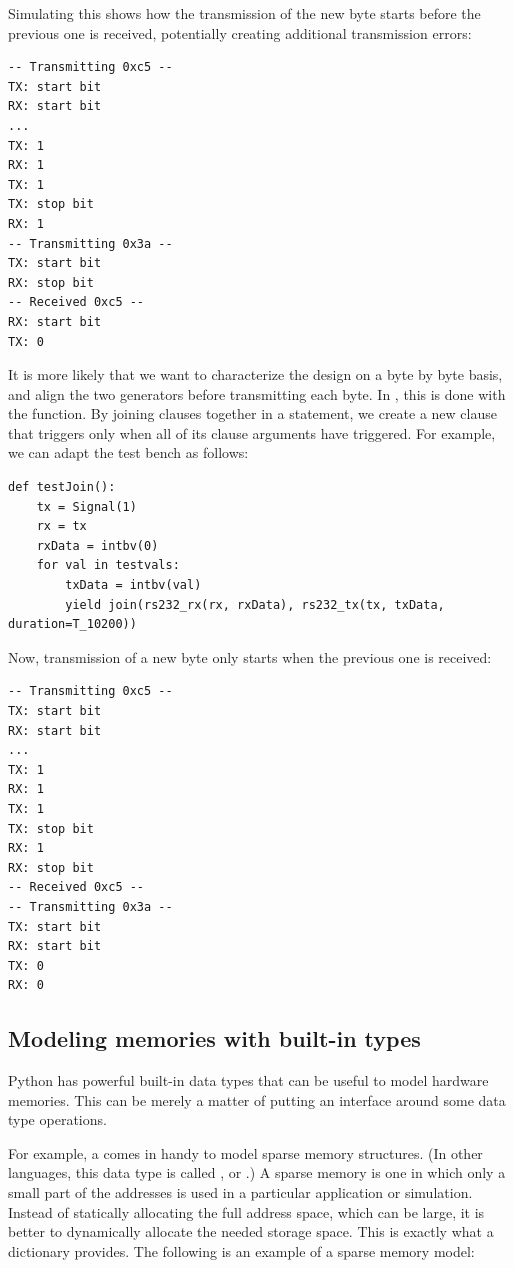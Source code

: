 Simulating this shows how the transmission of the new byte starts
before the previous one is received, potentially creating additional
transmission errors:

\begin{verbatim}
-- Transmitting 0xc5 --
TX: start bit
RX: start bit
...
TX: 1
RX: 1
TX: 1
TX: stop bit
RX: 1
-- Transmitting 0x3a --
TX: start bit
RX: stop bit
-- Received 0xc5 --
RX: start bit
TX: 0
\end{verbatim}

It is more likely that we want to characterize the design on a byte
by byte basis, and align the two generators before transmitting each
byte. In \myhdl{}, this is done with the  function. By
joining clauses together in a  statement, we create a new
clause that triggers only when all of its clause arguments have
triggered. For example, we can adapt the test bench as follows:

\begin{verbatim}
def testJoin():
    tx = Signal(1)
    rx = tx
    rxData = intbv(0)
    for val in testvals:
        txData = intbv(val)
        yield join(rs232_rx(rx, rxData), rs232_tx(tx, txData, duration=T_10200))
\end{verbatim}

Now, transmission of a new byte only starts when the previous one is received:

\begin{verbatim}
-- Transmitting 0xc5 --
TX: start bit
RX: start bit
...
TX: 1
RX: 1
TX: 1
TX: stop bit
RX: 1
RX: stop bit
-- Received 0xc5 --
-- Transmitting 0x3a --
TX: start bit
RX: start bit
TX: 0
RX: 0
\end{verbatim}



\subsection{Modeling memories with built-in types \label{model-mem}}

Python has powerful built-in data types that can be useful to model
hardware memories. This can be merely a matter of putting an interface
around some data type operations.

For example, a  comes in handy to model sparse memory
structures. (In other languages, this data type is called 
, or .) A sparse memory is one in
which only a small part of the addresses is used in a particular
application or simulation. Instead of statically allocating the full
address space, which can be large, it is better to dynamically
allocate the needed storage space. This is exactly what a dictionary
provides. The following is an example of a sparse memory model:

